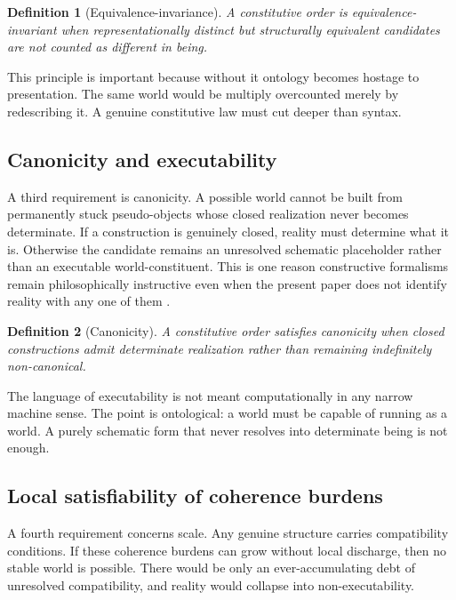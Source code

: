 \documentclass[11pt]{article}
\theoremstyle{foundation}
\newtheorem{definition}{Definition}
\begin{document}
\begin{definition}[Equivalence-invariance]
A constitutive order is equivalence-invariant when representationally distinct but structurally equivalent candidates are not counted as different in being.
\end{definition}

This principle is important because without it ontology becomes hostage to presentation. The same world would be multiply overcounted merely by redescribing it. A genuine constitutive law must cut deeper than syntax.

\subsection{Canonicity and executability}

A third requirement is canonicity. A possible world cannot be built from permanently stuck pseudo-objects whose closed realization never becomes determinate. If a construction is genuinely closed, reality must determine what it is. Otherwise the candidate remains an unresolved schematic placeholder rather than an executable world-constituent. This is one reason constructive formalisms remain philosophically instructive even when the present paper does not identify reality with any one of them \citep{MartinLof1984,UF2013}.

\begin{definition}[Canonicity]
A constitutive order satisfies canonicity when closed constructions admit determinate realization rather than remaining indefinitely non-canonical.
\end{definition}

The language of executability is not meant computationally in any narrow machine sense. The point is ontological: a world must be capable of running as a world. A purely schematic form that never resolves into determinate being is not enough.

\subsection{Local satisfiability of coherence burdens}

A fourth requirement concerns scale. Any genuine structure carries compatibility conditions. If these coherence burdens can grow without local discharge, then no stable world is possible. There would be only an ever-accumulating debt of unresolved compatibility, and reality would collapse into non-executability.
\end{document}
